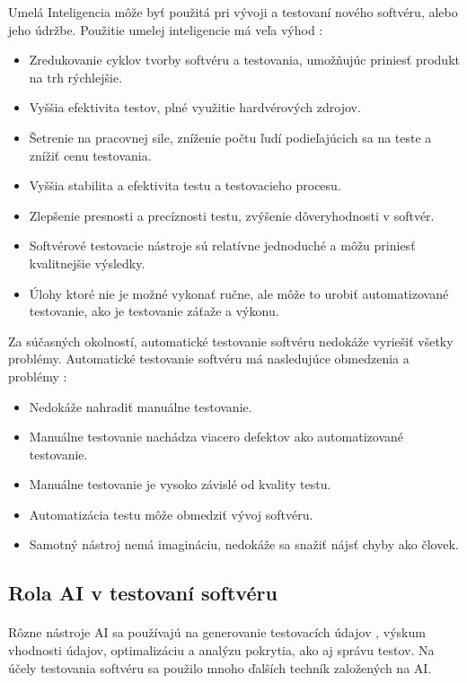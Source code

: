 \documentclass[10pt,twoside,slovak,a4paper]{article}
\begin{document}
 Umelá Inteligencia môže byť použitá pri vývoji a testovaní nového softvéru, alebo jeho údržbe. Použitie umelej inteligencie má veľa výhod \cite{6926420}:
\begin{itemize}
	\item Zredukovanie cyklov tvorby softvéru a testovania, umožňujúc priniesť produkt na trh rýchlejšie.  
	\item Vyššia efektivita testov, plné využitie hardvérových zdrojov. 
	\item Šetrenie na pracovnej sile, zníženie počtu ľudí podieľajúcich sa na teste a znížiť cenu testovania.
    \item Vyššia stabilita a efektivita testu a testovacieho procesu.
    \item Zlepšenie presnosti a precíznosti testu, zvýšenie dôveryhodnosti v softvér.
    \item Softvérové testovacie nástroje sú relatívne jednoduché a môžu priniesť kvalitnejšie výsledky.
    \item Úlohy ktoré nie je možné vykonať ručne, ale môže to urobiť automatizované testovanie, ako je testovanie záťaže a výkonu.
\end{itemize}
Za súčasných okolností, automatické testovanie softvéru nedokáže vyriešiť všetky problémy. Automatické testovanie softvéru má nasledujúce obmedzenia a problémy \cite{6926420}:
\begin{itemize}
	\item Nedokáže nahradiť manuálne testovanie.
	\item Manuálne testovanie nachádza viacero defektov ako automatizované testovanie.
	\item Manuálne testovanie je vysoko závislé od kvality testu.
	\item Automatizácia testu môže obmedziť vývoj softvéru.
	\item Samotný nástroj nemá imagináciu, nedokáže sa snažiť nájsť chyby ako človek.
\end{itemize}

\subsection{Rola AI v testovaní softvéru} \label{rola ai v sw}
\paragraph{}
Rôzne nástroje AI sa používajú na generovanie testovacích údajov , výskum vhodnosti údajov, optimalizáciu a analýzu pokrytia, ako aj správu testov. Na účely testovania softvéru sa použilo mnoho ďalších techník založených na AI. \cite{6926420}\\
\end{document}
